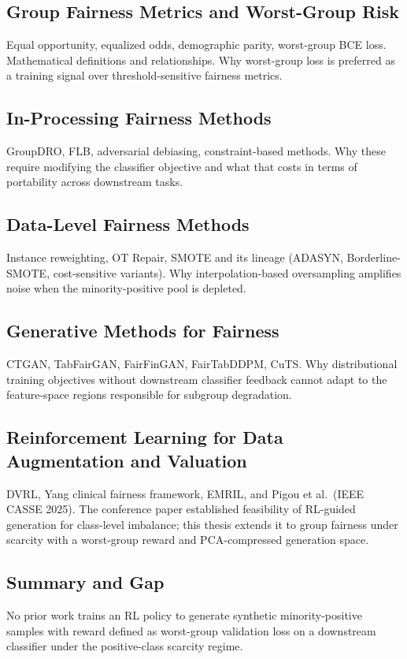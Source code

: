 \documentclass[12pt]{article}
\begin{document}
\subsection{Group Fairness Metrics and Worst-Group Risk}
Equal opportunity, equalized odds, demographic parity, worst-group BCE loss.
Mathematical definitions and relationships. Why worst-group loss is preferred
as a training signal over threshold-sensitive fairness metrics.

\subsection{In-Processing Fairness Methods}
GroupDRO, FLB, adversarial debiasing, constraint-based methods. Why these
require modifying the classifier objective and what that costs in terms of
portability across downstream tasks.

\subsection{Data-Level Fairness Methods}
Instance reweighting, OT Repair, SMOTE and its lineage (ADASYN,
Borderline-SMOTE, cost-sensitive variants). Why interpolation-based
oversampling amplifies noise when the minority-positive pool is depleted.

\subsection{Generative Methods for Fairness}
CTGAN, TabFairGAN, FairFinGAN, FairTabDDPM, CuTS. Why distributional
training objectives without downstream classifier feedback cannot adapt to the
feature-space regions responsible for subgroup degradation.

\subsection{Reinforcement Learning for Data Augmentation and Valuation}
DVRL, Yang clinical fairness framework, EMRIL, and Pigou et al.\ (IEEE CASSE
2025). The conference paper established feasibility of RL-guided generation
for class-level imbalance; this thesis extends it to group fairness under
scarcity with a worst-group reward and PCA-compressed generation space.

\subsection{Summary and Gap}
No prior work trains an RL policy to generate synthetic minority-positive
samples with reward defined as worst-group validation loss on a downstream
classifier under the positive-class scarcity regime.
\end{document}
